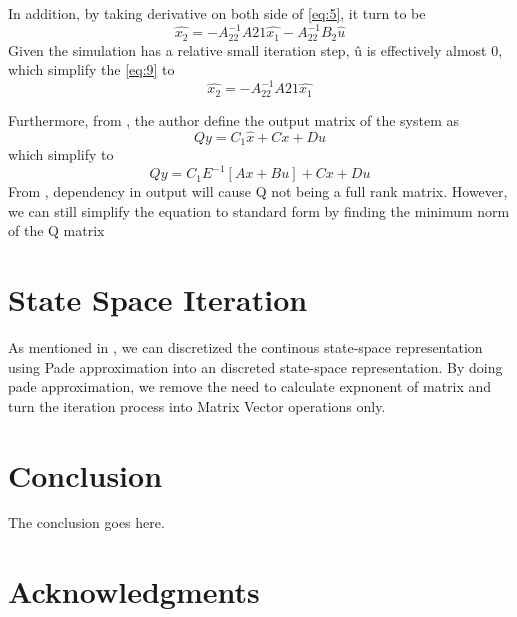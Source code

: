 \documentclass[conference]{IEEEtran}
\begin{document}
In addition, by taking derivative on both side of \eqref{eq:5}, it turn to be
\begin{equation}
  \hat{x_{2}} = -A_{22}^{-1}A21\hat{x_{1}}-A_{22}^{-1}B_{2}\hat{u}
  \label{eq:9}
\end{equation}
Given the simulation has a relative small iteration step, \^{u} is effectively almost 0, which 
simplify the \eqref{eq:9} to
\begin{equation}
  \hat{x_{2}} = -A_{22}^{-1}A21\hat{x_{1}}
\end{equation}



Furthermore, from \cite{Massarini921362}, the author define the output matrix of the system as
\begin{equation}
  Qy=C_{1}\hat{x}+Cx+Du
  \label{eq:11}
\end{equation}
which simplify to 
\begin{equation}
  Qy = C_{1}E^{-1}[Ax+Bu]+Cx+Du
\end{equation}
From \cite{Massarini921362}, dependency in output will cause Q not being a full rank matrix. However, we can still simplify the equation to standard form
by finding the minimum norm of the Q matrix



\section{State Space Iteration}

As mentioned in \cite{Kiffe9570187}, we can discretized the continous state-space representation using Pade approximation into an discreted state-space representation.
By doing pade approximation, we remove the need to calculate expnonent of matrix and turn
the iteration process into Matrix Vector operations only.



\section{Conclusion} 
\label{sec:conclusion}

The conclusion goes here.

\section*{Acknowledgments}




\end{document}

